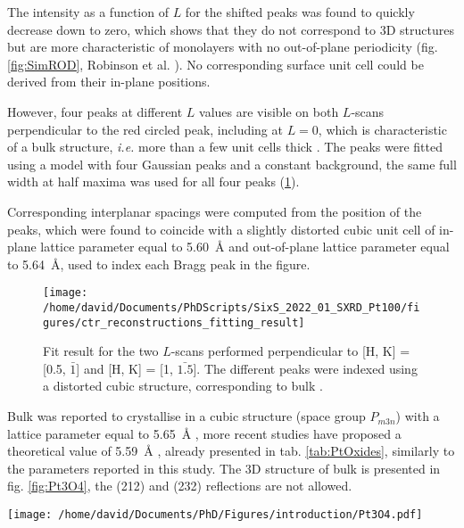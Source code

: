 The intensity as a function of $L$ for the shifted peaks was found to quickly decrease down to zero, which shows that they do not correspond to 3D structures but are more characteristic of monolayers with no out-of-plane periodicity (fig. \ref{fig:SimROD}, Robinson et al. \cite*{Robinson1991}).
No corresponding surface unit cell could be derived from their in-plane positions.

However, four peaks at different $L$ values are visible on both $L$-scans perpendicular to the red circled peak, including at $L=0$, which is characteristic of a bulk structure, \textit{i.e.} more than a few unit cells thick \parencite{Robinson1991}.
The peaks were fitted using a model with four Gaussian peaks and a constant background, the same full width at half maxima was used for all four peaks (\ref{fig:FitPt100LScans}).

Corresponding interplanar spacings were computed from the position of the peaks, which were found to coincide with a slightly distorted cubic unit cell of in-plane lattice parameter equal to \qty{5.60}{\angstrom} and out-of-plane lattice parameter equal to \qty{5.64}{\angstrom}, used to index each Bragg peak in the figure.

\begin{figure}[!htb]
    \centering
    \texttt{[image: /home/david/Documents/PhDScripts/SixS\_2022\_01\_SXRD\_Pt100/figures/ctr\_reconstructions\_fitting\_result]}
    \caption{
        Fit result for the two $L$-scans performed perpendicular to [H, K] = [0.5, $\bar{1}$] and [H, K] = [1, $\bar{1.5}$].
        The different peaks were indexed using a distorted cubic structure, corresponding to bulk .
    }
    \label{fig:FitPt100LScans}
\end{figure}

Bulk  was reported to crystallise in a cubic structure (space group $P_{m3n}$) with a lattice parameter equal to \qty{5.65}{\angstrom} \parencite{Galloni1941, Galloni1952, Muller1968}, more recent studies have proposed a theoretical value of \qty{5.59}{\angstrom} \parencite{Seriani2006}, already presented in tab. \ref{tab:PtOxides}, similarly to the parameters reported in this study.
The 3D structure of bulk  is presented in fig. \ref{fig:Pt3O4}, the (212) and (232) reflections are not allowed.

\begin{SCfigure}
    \centering
    \texttt{[image: /home/david/Documents/PhD/Figures/introduction/Pt3O4.pdf]}
    \caption{
         bulk unit cell.
        Platinum atoms are situated on the faces on the cubic unit cell (e.g. $(0, 1/2, 1/4)$, $(0, 1/2, 3/4)$), while the eight oxygen atoms are inside the unit cell at the positions $(1/4, 1/4, z)$, $(1/4, 2/4, z)$, $(2/4, 1/4, z)$, $(2/4, 2/4, z)$ for $z=1/4$ and $z=3/4$.
    }
    \label{fig:Pt3O4}
\end{SCfigure}

